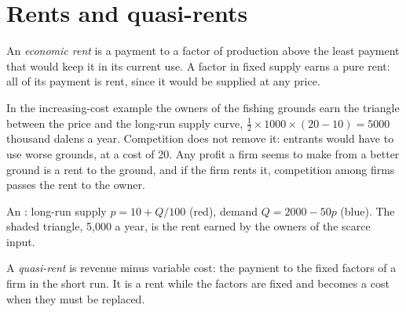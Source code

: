 \section{Rents and quasi-rents}\label{sec:b1:competitive-industry:rents}

\begin{definition}\label{def:b1:competitive-industry:rent}
An \emph{economic rent} is a payment to a factor of production above the
least payment that would keep it in its current use. A factor in fixed
supply earns a pure rent: all of its payment is rent, since it would be
supplied at any price.
\end{definition}

In the increasing-cost example the owners of the fishing grounds earn the
triangle between the price and the long-run supply curve,
$\tfrac12 \times 1000 \times (20 - 10) = 5000$ thousand dalens a year. Competition does not
remove it: entrants would have to use worse grounds, at a cost of 20. Any
profit a firm seems to make from a better ground is a rent to the ground,
and if the firm rents it, competition among firms passes the rent to the
owner.

\begin{omfigure}

{\small An : long-run supply $p = 10 + Q/100$ (red),
demand $Q = 2000 - 50p$ (blue). The shaded triangle, 5,000 a year, is the rent
earned by the owners of the scarce input.}
\end{omfigure}

\begin{definition}\label{def:b1:competitive-industry:quasi-rent}
A \emph{quasi-rent} is revenue minus variable cost: the payment to the
fixed factors of a firm in the short run. It is a rent while the factors
are fixed and becomes a cost when they must be replaced.
\end{definition}

